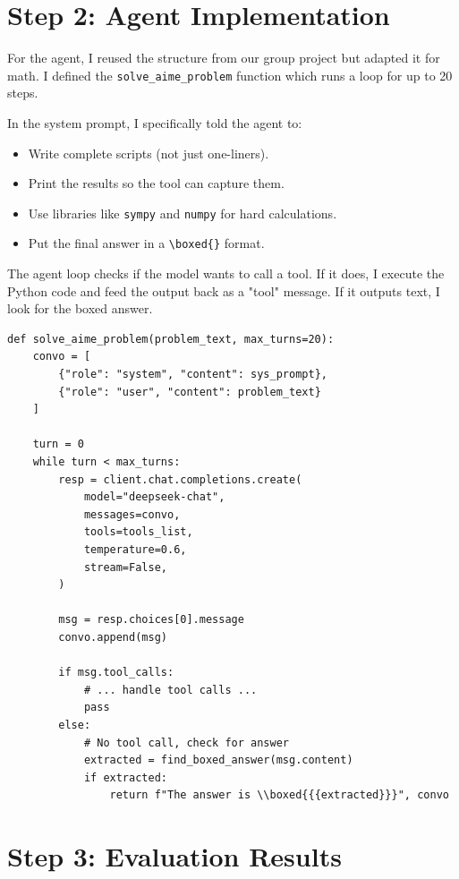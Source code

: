 \documentclass{article}
\begin{document}
\section{Step 2: Agent Implementation}

For the agent, I reused the structure from our group project but adapted it for math. I defined the \texttt{solve\_aime\_problem} function which runs a loop for up to 20 steps. 

In the system prompt, I specifically told the agent to:
\begin{itemize}
    \item Write complete scripts (not just one-liners).
    \item Print the results so the tool can capture them.
    \item Use libraries like \texttt{sympy} and \texttt{numpy} for hard calculations.
    \item Put the final answer in a \texttt{\textbackslash boxed\{\}} format.
\end{itemize}

The agent loop checks if the model wants to call a tool. If it does, I execute the Python code and feed the output back as a "tool" message. If it outputs text, I look for the boxed answer.

\begin{lstlisting}[caption={The Agent Loop}]
def solve_aime_problem(problem_text, max_turns=20):
    convo = [
        {"role": "system", "content": sys_prompt},
        {"role": "user", "content": problem_text}
    ]
    
    turn = 0
    while turn < max_turns:
        resp = client.chat.completions.create(
            model="deepseek-chat",
            messages=convo,
            tools=tools_list,
            temperature=0.6,
            stream=False,
        )

        msg = resp.choices[0].message
        convo.append(msg)

        if msg.tool_calls:
            # ... handle tool calls ...
            pass
        else:
            # No tool call, check for answer
            extracted = find_boxed_answer(msg.content)
            if extracted:
                return f"The answer is \\boxed{{{extracted}}}", convo
\end{lstlisting}

\section{Step 3: Evaluation Results}
\end{document}

